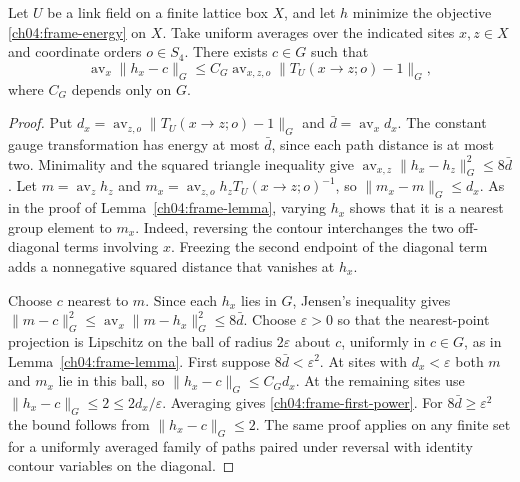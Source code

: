 \begin{lemma}
\label{ch04:minimizing-frame-bound}
Let $U$ be a link field on a finite lattice box $X$, and let $h$ minimize
the objective \eqref{ch04:frame-energy} on $X$. Take uniform averages
over the indicated sites $x,z\in X$ and coordinate orders $o\in S_4$.
There exists $c\in G$ such that
\begin{equation}
 \operatorname{av}_x\|h_x-c\|_G
 \le C_G\operatorname{av}_{x,z,o}\|T_U(x\to z;o)-1\|_G ,
 \label{ch04:frame-first-power}
\end{equation}
where $C_G$ depends only on $G$.
\end{lemma}
\begin{proof}
Put $d_x=\operatorname{av}_{z,o}\|T_U(x\to z;o)-1\|_G$ and
$\bar d=\operatorname{av}_x d_x$. The constant gauge transformation has energy at most $\bar d$, since each path distance
is at most two. Minimality and the squared triangle inequality give
$\operatorname{av}_{x,z}\|h_x-h_z\|_G^2\le8\bar d$.
Let $m=\operatorname{av}_z h_z$ and
$m_x=\operatorname{av}_{z,o}h_zT_U(x\to z;o)^{-1}$, so
$\|m_x-m\|_G\le d_x$. As in the proof of Lemma~\ref{ch04:frame-lemma},
varying $h_x$ shows that it is a nearest group element to $m_x$.
Indeed, reversing the contour interchanges the two off-diagonal terms
involving $x$. Freezing the second endpoint of the diagonal term adds
a nonnegative squared distance that vanishes at $h_x$.

Choose $c$ nearest to $m$. Since each $h_x$ lies in $G$, Jensen's
inequality gives $\|m-c\|_G^2\le\operatorname{av}_x\|m-h_x\|_G^2
\le8\bar d$. Choose $\varepsilon>0$ so that the nearest-point
projection is Lipschitz on the ball of radius $2\varepsilon$ about $c$,
uniformly in $c\in G$, as in Lemma~\ref{ch04:frame-lemma}.
First suppose $8\bar d<\varepsilon^2$. At sites with $d_x<\varepsilon$
both $m$ and $m_x$ lie in this ball, so $\|h_x-c\|_G\le C_Gd_x$.
At the remaining sites use $\|h_x-c\|_G\le2\le2d_x/\varepsilon$.
Averaging gives \eqref{ch04:frame-first-power}. For
$8\bar d\ge\varepsilon^2$ the bound follows from $\|h_x-c\|_G\le2$.
The same proof applies on any finite
set for a uniformly averaged family of paths paired under reversal
with identity contour variables on the diagonal.
\end{proof}

